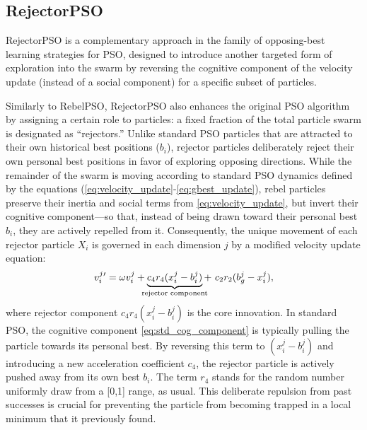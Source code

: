 {\subsection{RejectorPSO}

RejectorPSO is a complementary approach in the family of opposing-best learning strategies for PSO, designed to introduce another targeted form of exploration into the swarm by reversing the cognitive component of the velocity update (instead of a social component) for a specific subset of particles. 

Similarly to RebelPSO, RejectorPSO also enhances the original PSO algorithm by assigning a certain role to particles:
a fixed fraction of the total particle swarm is designated as ``rejectors.'' Unlike standard PSO particles that are attracted to their own historical best positions ($b_i$), rejector particles deliberately reject their own personal best positions in favor of exploring opposing directions.
While the remainder of the swarm is moving according to standard PSO dynamics defined by the equations (\ref{eq:velocity_update}-\ref{eq:gbest_update}), rebel particles
preserve their inertia and social terms from \eqref{eq:velocity_update}, but invert their cognitive component---so that, instead of being drawn toward their personal best $b_i$, they are actively repelled from it.
Consequently, the unique movement of each rejector particle $X_i$ is governed in each dimension $j$ by a modified velocity update equation:
\begin{equation}\label{eq:velocity_update_rejector}
v_{i}^{j}{}'= \omega v_{i}^{j} + 
\underbrace{c_4 r_4 (x_{i}^{j} - b_{i}^{j})}_{\mathclap{\text{rejector component}}} +\ 
c_2 r_2 (b_{g}^{j} - x_{i}^{j}),
\end{equation}
where rejector component $c_4 r_4 (x_{i}^{j} - b_{i}^{j})$ is the core innovation. In standard PSO, the cognitive component \eqref{eq:std_cog_component} is typically pulling the particle towards its personal best. By reversing this term to $(x_{i}^{j} - b_{i}^{j})$ and introducing a new acceleration coefficient $c_4$, the rejector particle is actively pushed away from its own best $b_i$. The term $r_4$ stands for the random number uniformly draw from a [0,1] range, as usual. This deliberate repulsion from past successes is crucial for preventing the particle from becoming trapped in a local minimum that it previously found.

\begin{figure}[H]
    \centering
\end{figure}}
